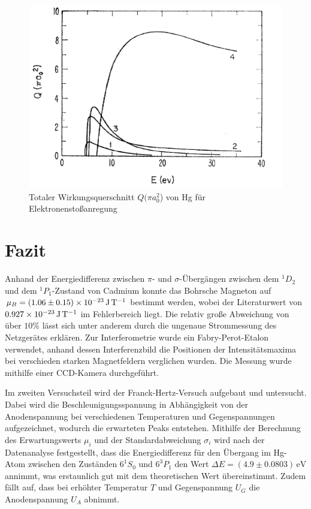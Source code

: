 \documentclass{article}
\begin{document}
\begin{multicols}{2}
\begin{figure}[H]
  \centering
  \includegraphics[scale=0.55]{Totaler Wirkungsquerschnitt.png}
  \caption{Totaler Wirkungsquerschnitt $Q(\pi a^2_0$) von Hg für Elektronenstoßanregung}
  \label{Wirkungsquerschnitt}
\end{figure}
\clearpage
\section{Fazit}
Anhand der Energiedifferenz zwischen $\pi$- und $\sigma$-Übergängen zwischen dem $^1D_2$ und dem $^1P_1$-Zustand
von Cadmium konnte das Bohrsche Magneton auf $\mu_B = \SI{1.06\pm 0.15e-23}{\J\per\T}$ bestimmt werden,
wobei der Literaturwert von $\SI{0.927e-23}{\J\per\T}$ \cite{bohr-magneton} im Fehlerbereich liegt.
Die relativ große Abweichung von über $10\%$ lässt sich unter anderem durch die ungenaue Strommessung
des Netzgerätes erklären.
Zur Interferometrie wurde ein Fabry-Perot-Etalon verwendet, anhand dessen Interferenzbild die Positionen der Intensitätsmaxima
bei verschieden starken Magnetfeldern verglichen wurden. Die Messung wurde mithilfe einer CCD-Kamera durchgeführt.

Im zweiten Versuchsteil wird der Franck-Hertz-Versuch aufgebaut und untersucht. Dabei 
wird die Beschleunigungsspannung in Abhängigkeit von der Anodenspannung bei verschiedenen 
Temperaturen und Gegenspannungen aufgezeichnet, wodurch die erwarteten Peaks entstehen. 
Mithilfe der Berechnung des Erwartungswerts $\mu_i$ und der Standardabweichung $\sigma_i$ 
wird nach der Datenanalyse festgestellt, dass die Energiedifferenz für den Übergang im 
Hg-Atom zwischen den Zuständen $6^1S_0$ und $6^3P_1$ den Wert $\Delta E = (4.9 \pm 0.0803) \, 
\text{eV}$ annimmt, was erstaunlich gut mit dem theoretischen Wert übereinstimmt. Zudem 
fällt auf, dass bei erhöhter Temperatur $T$ und Gegenspannung $U_G$ die Anodenspannung $U_A$ abnimmt.






\end{multicols}
\end{document}
